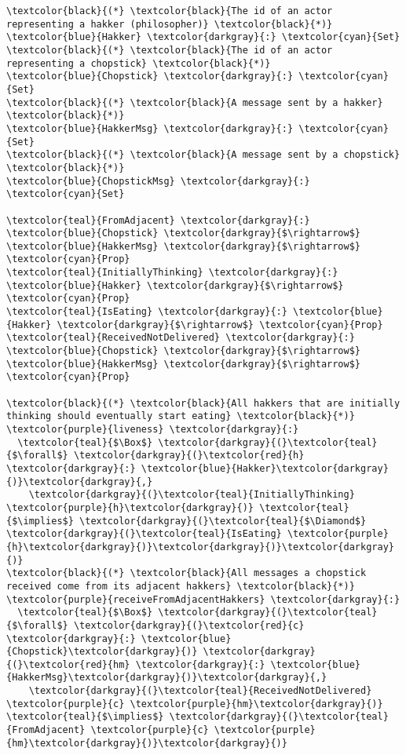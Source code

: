 \begin{Verbatim}[commandchars=\\\{\},codes={\catcode`$=3}]
\textcolor{black}{(*} \textcolor{black}{The id of an actor representing a hakker (philosopher)} \textcolor{black}{*)}
\textcolor{blue}{Hakker} \textcolor{darkgray}{:} \textcolor{cyan}{Set}
\textcolor{black}{(*} \textcolor{black}{The id of an actor representing a chopstick} \textcolor{black}{*)}
\textcolor{blue}{Chopstick} \textcolor{darkgray}{:} \textcolor{cyan}{Set}
\textcolor{black}{(*} \textcolor{black}{A message sent by a hakker} \textcolor{black}{*)}
\textcolor{blue}{HakkerMsg} \textcolor{darkgray}{:} \textcolor{cyan}{Set}
\textcolor{black}{(*} \textcolor{black}{A message sent by a chopstick} \textcolor{black}{*)}
\textcolor{blue}{ChopstickMsg} \textcolor{darkgray}{:} \textcolor{cyan}{Set}

\textcolor{teal}{FromAdjacent} \textcolor{darkgray}{:} \textcolor{blue}{Chopstick} \textcolor{darkgray}{$\rightarrow$} \textcolor{blue}{HakkerMsg} \textcolor{darkgray}{$\rightarrow$} \textcolor{cyan}{Prop}
\textcolor{teal}{InitiallyThinking} \textcolor{darkgray}{:} \textcolor{blue}{Hakker} \textcolor{darkgray}{$\rightarrow$} \textcolor{cyan}{Prop}
\textcolor{teal}{IsEating} \textcolor{darkgray}{:} \textcolor{blue}{Hakker} \textcolor{darkgray}{$\rightarrow$} \textcolor{cyan}{Prop}
\textcolor{teal}{ReceivedNotDelivered} \textcolor{darkgray}{:} \textcolor{blue}{Chopstick} \textcolor{darkgray}{$\rightarrow$} \textcolor{blue}{HakkerMsg} \textcolor{darkgray}{$\rightarrow$} \textcolor{cyan}{Prop}

\textcolor{black}{(*} \textcolor{black}{All hakkers that are initially thinking should eventually start eating} \textcolor{black}{*)}
\textcolor{purple}{liveness} \textcolor{darkgray}{:}
  \textcolor{teal}{$\Box$} \textcolor{darkgray}{(}\textcolor{teal}{$\forall$} \textcolor{darkgray}{(}\textcolor{red}{h} \textcolor{darkgray}{:} \textcolor{blue}{Hakker}\textcolor{darkgray}{)}\textcolor{darkgray}{,}
    \textcolor{darkgray}{(}\textcolor{teal}{InitiallyThinking} \textcolor{purple}{h}\textcolor{darkgray}{)} \textcolor{teal}{$\implies$} \textcolor{darkgray}{(}\textcolor{teal}{$\Diamond$} \textcolor{darkgray}{(}\textcolor{teal}{IsEating} \textcolor{purple}{h}\textcolor{darkgray}{)}\textcolor{darkgray}{)}\textcolor{darkgray}{)}
\textcolor{black}{(*} \textcolor{black}{All messages a chopstick received come from its adjacent hakkers} \textcolor{black}{*)}
\textcolor{purple}{receiveFromAdjacentHakkers} \textcolor{darkgray}{:}
  \textcolor{teal}{$\Box$} \textcolor{darkgray}{(}\textcolor{teal}{$\forall$} \textcolor{darkgray}{(}\textcolor{red}{c} \textcolor{darkgray}{:} \textcolor{blue}{Chopstick}\textcolor{darkgray}{)} \textcolor{darkgray}{(}\textcolor{red}{hm} \textcolor{darkgray}{:} \textcolor{blue}{HakkerMsg}\textcolor{darkgray}{)}\textcolor{darkgray}{,}
    \textcolor{darkgray}{(}\textcolor{teal}{ReceivedNotDelivered} \textcolor{purple}{c} \textcolor{purple}{hm}\textcolor{darkgray}{)} \textcolor{teal}{$\implies$} \textcolor{darkgray}{(}\textcolor{teal}{FromAdjacent} \textcolor{purple}{c} \textcolor{purple}{hm}\textcolor{darkgray}{)}\textcolor{darkgray}{)}
\end{Verbatim}
